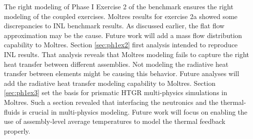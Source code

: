The right modeling of Phase I Exercise 2 of the benchmark ensures the right modeling of the coupled exercises.
Moltres results for exercise 2a showed some discrepancies to INL benchmark results.
As discussed earlier, the flat flow approximation may be the cause.
Future work will add a mass flow distribution capability to Moltres.
Section \ref{sec:ph1ex2} first analysis intended to reproduce INL results.
That analysis reveals that Moltres modeling fails to capture the right heat transfer between different assemblies.
Not modeling the radiative heat transfer between elements might be causing this behavior.
Future analyses will add the radiative heat transfer modeling capability to Moltres.
Section \ref{sec:ph1ex3} set the basis for prismatic HTGR multi-physics simulations in Moltres.
Such a section revealed that interfacing the neutronics and the thermal-fluids is crucial in multi-physics modeling. 
Future work will focus on enabling the use of assembly-level average temperatures to model the thermal feedback properly.



